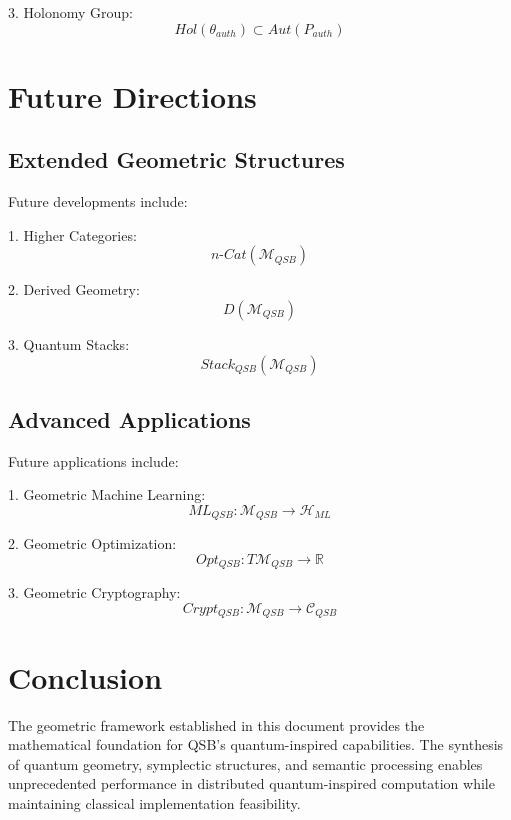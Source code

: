 \documentclass[12pt]{article}
\begin{document}
3. Holonomy Group:
\begin{equation}
Hol(θ_{auth}) \subset Aut(P_{auth})
\end{equation}

\section{Future Directions}

\subsection{Extended Geometric Structures}

Future developments include:

1. Higher Categories:
\begin{equation}
n\text{-}Cat(\mathcal{M}_{QSB})
\end{equation}

2. Derived Geometry:
\begin{equation}
D(\mathcal{M}_{QSB})
\end{equation}

3. Quantum Stacks:
\begin{equation}
Stack_{QSB}(\mathcal{M}_{QSB})
\end{equation}

\subsection{Advanced Applications}

Future applications include:

1. Geometric Machine Learning:
\begin{equation}
ML_{QSB}: \mathcal{M}_{QSB} \rightarrow \mathcal{H}_{ML}
\end{equation}

2. Geometric Optimization:
\begin{equation}
Opt_{QSB}: T\mathcal{M}_{QSB} \rightarrow \mathbb{R}
\end{equation}

3. Geometric Cryptography:
\begin{equation}
Crypt_{QSB}: \mathcal{M}_{QSB} \rightarrow \mathcal{C}_{QSB}
\end{equation}

\section{Conclusion}

The geometric framework established in this document provides the mathematical foundation for QSB's quantum-inspired capabilities. The synthesis of quantum geometry, symplectic structures, and semantic processing enables unprecedented performance in distributed quantum-inspired computation while maintaining classical implementation feasibility.
\end{document}
